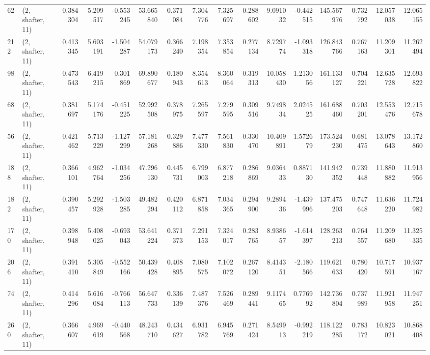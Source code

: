 \begin{tabular}{llrrrrrrrrrrrrrr}
62  &  (2, shafter, 11) &   0.384304 &   5.209517 &  -0.553245 &    53.665840 &   0.371084 &   7.304776 &   7.325697 &  0.288602 &   9.091032 &  -0.442515 &   145.567976 &   0.732792 &  12.057038 &  12.065155 \\
212 &  (2, shafter, 11) &   0.413345 &   5.603191 &  -1.504287 &    54.079173 &   0.366240 &   7.198354 &   7.353854 &  0.277134 &   8.729774 &  -1.093318 &   126.843766 &   0.767163 &  11.209301 &  11.262494 \\
98  &  (2, shafter, 11) &   0.473543 &   6.419215 &  -0.301869 &    69.890677 &   0.180943 &   8.354613 &   8.360064 &  0.319313 &  10.058430 &   1.213056 &   161.133127 &   0.704221 &  12.635728 &  12.693822 \\
68  &  (2, shafter, 11) &   0.381697 &   5.174176 &  -0.451225 &    52.992508 &   0.378975 &   7.265597 &   7.279595 &  0.309516 &   9.749834 &   2.024525 &   161.688460 &   0.703201 &  12.553476 &  12.715678 \\
56  &  (2, shafter, 11) &   0.421462 &   5.713229 &  -1.127299 &    57.181268 &   0.329886 &   7.477330 &   7.561830 &  0.330470 &  10.409891 &   1.572679 &   173.524230 &   0.681475 &  13.078643 &  13.172860 \\
188 &  (2, shafter, 11) &   0.366101 &   4.962764 &  -1.034256 &    47.296130 &   0.445731 &   6.799003 &   6.877218 &  0.286869 &   9.036433 &   0.887130 &   141.942352 &   0.739448 &  11.880882 &  11.913956 \\
182 &  (2, shafter, 11) &   0.390457 &   5.292928 &  -1.503285 &    49.482294 &   0.420112 &   6.871858 &   7.034365 &  0.294900 &   9.289436 &  -1.439996 &   137.475203 &   0.747648 &  11.636220 &  11.724982 \\
170 &  (2, shafter, 11) &   0.398948 &   5.408025 &  -0.693043 &    53.641224 &   0.371373 &   7.291153 &   7.324017 &  0.283765 &   8.938657 &  -1.614397 &   128.263213 &   0.764557 &  11.209680 &  11.325335 \\
206 &  (2, shafter, 11) &   0.391410 &   5.305849 &  -0.552166 &    50.439428 &   0.408895 &   7.080575 &   7.102072 &  0.267120 &   8.414351 &  -2.180566 &   119.621633 &   0.780420 &  10.717591 &  10.937167 \\
74  &  (2, shafter, 11) &   0.414296 &   5.616084 &  -0.766113 &    56.647733 &   0.336139 &   7.487376 &   7.526469 &  0.289441 &   9.117465 &   0.776992 &   142.736804 &   0.737989 &  11.921958 &  11.947251 \\
260 &  (2, shafter, 11) &   0.366607 &   4.969619 &  -0.440568 &    48.243710 &   0.434627 &   6.931782 &   6.945769 &  0.271424 &   8.549913 &  -0.992219 &   118.122285 &   0.783172 &  10.823021 &  10.868408 \\

\end{tabular}
